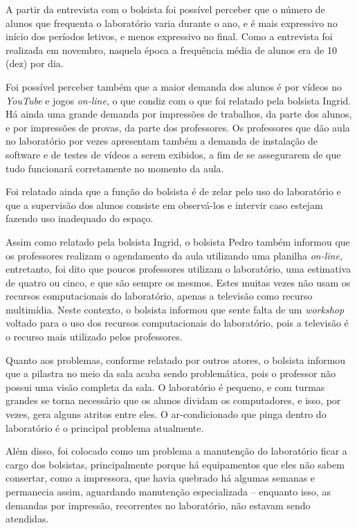 A partir da entrevista com o bolsista foi possível perceber que o número de alunos que frequenta o laboratório varia durante o ano, e é mais expressivo no início dos períodos letivos, e menos expressivo no final. Como a entrevista foi realizada em novembro, naquela época a frequência média de alunos era de 10 (dez) por dia.

Foi possível perceber também que a maior demanda dos alunos é por vídeos no \textit{YouTube} e jogos \textit{on-line}, o que condiz com o que foi relatado pela bolsista Ingrid. Há ainda uma grande demanda por impressões de trabalhos, da parte dos alunos, e por impressões de provas, da parte dos professores. Os professores que dão aula no laboratório por vezes apresentam também a demanda de instalação de software e de testes de vídeos a serem exibidos, a fim de se assegurarem de que tudo funcionará corretamente no momento da aula.

Foi relatado ainda que a função do bolsista é de zelar pelo uso do laboratório e que a supervisão dos alunos consiste em observá-los e intervir caso estejam fazendo uso inadequado do espaço.

Assim como relatado pela bolsista Ingrid, o bolsista Pedro também informou que os professores realizam o agendamento da aula utilizando uma planilha \textit{on-line}, entretanto, foi dito que poucos professores utilizam o laboratório, uma estimativa de quatro ou cinco, e que são sempre os mesmos. Estes muitas vezes não usam os recursos computacionais do laboratório, apenas a televisão como recurso multimídia. Neste contexto, o bolsista informou que sente falta de um \textit{workshop} voltado para o uso dos recursos computacionais do laboratório, pois a televisão é o recurso mais utilizado pelos professores.

Quanto aos problemas, conforme relatado por outros atores, o bolsista informou que a pilastra no meio da sala acaba sendo problemática, pois o professor não possui uma visão completa da sala. O laboratório é pequeno, e com turmas grandes se torna necessário que os alunos dividam os computadores, e isso, por vezes, gera alguns atritos entre eles. O ar-condicionado que pinga dentro do laboratório é o principal problema atualmente.

Além disso, foi colocado como um problema a manutenção do laboratório ficar a cargo dos bolsistas, principalmente porque há equipamentos que eles não sabem consertar, como a impressora, que havia quebrado há algumas semanas e permanecia assim, aguardando manutenção especializada -- enquanto isso, as demandas por impressão, recorrentes no laboratório, não estavam sendo atendidas.

